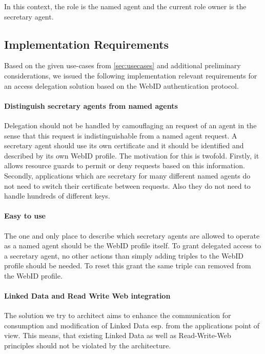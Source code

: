 \documentclass[a4paper]{llncs}
\begin{document}
In this context, the role is the named agent and the current role owner is the secretary agent.

\subsection{Implementation Requirements}\label{sec:req}

Based on the given use-cases from \autoref{sec:usecases} and additional preliminary considerations, we issued the following implementation relevant requirements for an access delegation solution based on the WebID authentication protocol.

\paragraph{Distinguish secretary agents from named agents}
Delegation should not be handled by camouflaging an request of an agent in the sense that this request is indistinguishable from a named agent request.
A secretary agent should use its own certificate and it should be identified and described by its own WebID profile.
The motivation for this is twofold.
Firstly, it allows resource guards to permit or deny requests based on this information.
Secondly, applications which are secretary for many different named agents do not need to switch their certificate between requests.
Also they do not need to handle hundreds of different keys.

\paragraph{Easy to use}
The one and only place to describe which secretary agents are allowed to operate as a named agent should be the WebID profile itself.
To grant delegated access to a secretary agent, no other actions than simply adding triples to the WebID profile should be needed.
To reset this grant the same triple can removed from the WebID profile. 

\paragraph{Linked Data and Read Write Web integration}

The solution we try to architect aims to enhance the communication for consumption and modification of Linked Data esp. from the applications point of view.
This means, that existing Linked Data as well as Read-Write-Web principles should not be violated by the architecture.
\end{document}
